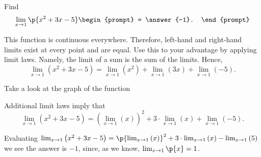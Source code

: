\documentclass{ximera}
\author{Gregory Hartman \and Matthew Carr}
\begin{document}
\begin{exercise}


  
  
  Find 
  \[
  \lim_{x\to 1}\p{x^2+3x-5}
  \begin{prompt}
  = \answer{-1}.
  \end{prompt}
  \]
  
   \begin{hint}
      This function is continuous everywhere. Therefore, left-hand and right-hand limits exist at every point and are equal. Use this to your advantage by applying limit laws. Namely, the limit of a sum is the sum of the limits. Hence, 
    \[
    \lim_{x\to 1} \left( x^2+3x-5 \right)  
    = \lim_{x\to 1} \left( x^2 \right) +
    \lim_{x\to 1} \left( 3x \right) +
    \lim_{x\to 1} \left( -5 \right).
    \]
    \end{hint}
    
     \begin{hint}
    Take a look at the graph of the function
    \begin{center}
      \end{center}
    Additional limit laws imply that
    \[
    \lim_{x\to 1} \left( x^2+3x-5 \right)  
    = \left( \lim_{x\to 1} \left( x \right) \right)^2 +
    3 \cdot \lim_{x\to 1} \left( x \right) +
    \lim_{x\to 1} \left( -5 \right).
    \]
    \end{hint}
    \begin{hint}
     Evaluating $\lim_{x\to 1} \left(x^2+3x-5\right)  
    = \p{\lim_{x\to 1} \left( x \right)}^2 +
    3\cdot\lim_{x\to 1} \left( x \right) -
    \lim_{x\to 1} \left(5\right)$
    we see the answer is $-1$, since, as we know, $\lim_{x\to1}\p{x}=1$.
    \end{hint}
    
\end{exercise}
\end{document}
